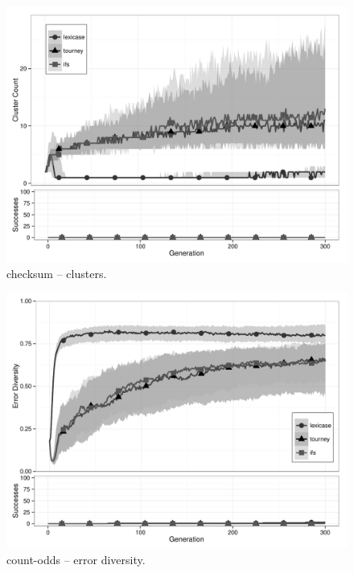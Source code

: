 \begin{figure}%
\centering
\includegraphics[width=11.5cm]{checksum-cluster.pdf}
\caption{checksum -- clusters.}
\label{checksumClu}
\end{figure}

\begin{figure}%
\centering
\includegraphics[width=11.5cm]{count-odds-diversity.pdf}
\caption{count-odds -- error diversity.}
\label{count-oddsDiv}
\end{figure}

